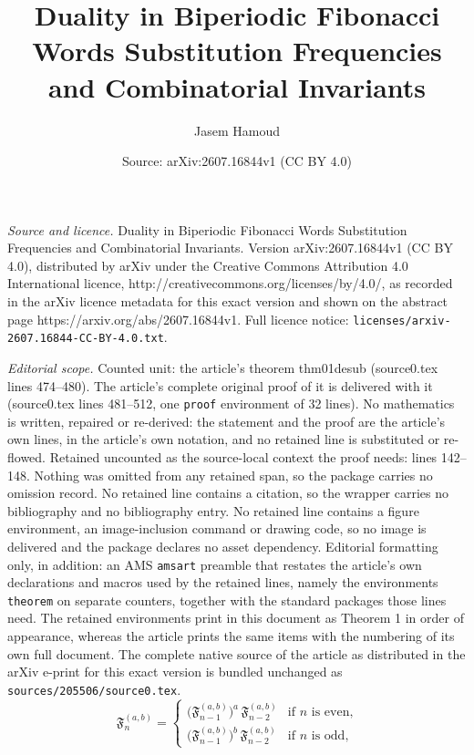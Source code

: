 \documentclass[10pt,a4paper]{amsart}
\title{Duality in Biperiodic Fibonacci Words Substitution Frequencies and Combinatorial Invariants}
\author{Jasem Hamoud}
\date{Source: arXiv:2607.16844v1 (CC BY 4.0)}
\newcommand{\FD}{\mathfrak{F}}
\begin{document}
\maketitle

\noindent\emph{Source and licence.} Duality in Biperiodic Fibonacci Words Substitution Frequencies and Combinatorial Invariants. Version arXiv:2607.16844v1 (CC BY 4.0), distributed by arXiv under the Creative Commons Attribution 4.0 International licence, http://creativecommons.org/licenses/by/4.0/, as recorded in the arXiv licence metadata for this exact version and shown on the abstract page https://arxiv.org/abs/2607.16844v1. Full licence notice: \texttt{licenses/arxiv-2607.16844-CC-BY-4.0.txt}.\par\smallskip

\noindent\textit{Editorial scope.} Counted unit: the article's theorem thm01desub (source0.tex lines 474--480). The article's complete original proof of it is delivered with it (source0.tex lines 481--512, one \texttt{proof} environment of 32 lines). No mathematics is written, repaired or re-derived: the statement and the proof are the article's own lines, in the article's own notation, and no retained line is substituted or re-flowed.  Retained uncounted as the source-local context the proof needs: lines 142--148.  Nothing was omitted from any retained span, so the package carries no omission record.  No retained line contains a citation, so the wrapper carries no bibliography and no bibliography entry.  No retained line contains a figure environment, an image-inclusion command or drawing code, so no image is delivered and the package declares no asset dependency.  Editorial formatting only, in addition: an AMS \texttt{amsart} preamble that restates the article's own declarations and macros used by the retained lines, namely the environments \texttt{theorem} on separate counters, together with the standard packages those lines need.  The retained environments print in this document as Theorem 1 in order of appearance, whereas the article prints the same items with the numbering of its own full document.  The complete native source of the article as distributed in the arXiv e-print for this exact version is bundled unchanged as \texttt{sources/205506/source0.tex}.
\begin{equation}~\label{eqq01biperiodicrecurrence}
  \FD^{(a,b)}_n =
  \begin{cases}
    \bigl(\FD^{(a,b)}_{n-1}\bigr)^a\, \FD^{(a,b)}_{n-2} & \text{if } n \text{ is even},\\[4pt]
    \bigl(\FD^{(a,b)}_{n-1}\bigr)^b\, \FD^{(a,b)}_{n-2} & \text{if } n \text{ is odd},
  \end{cases}
\end{equation}
\end{document}
